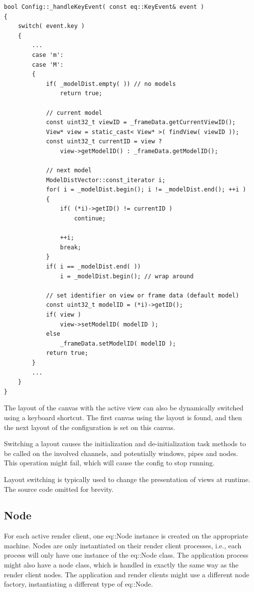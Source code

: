 \documentclass[10pt,a4]{scrartcl}
\begin{document}
{\footnotesize\begin{lstlisting}
bool Config::_handleKeyEvent( const eq::KeyEvent& event )
{
    switch( event.key )
    {
        ...
        case 'm':
        case 'M':
        {
            if( _modelDist.empty( )) // no models
                return true;

            // current model
            const uint32_t viewID = _frameData.getCurrentViewID();
            View* view = static_cast< View* >( findView( viewID ));
            const uint32_t currentID = view ? 
                view->getModelID() : _frameData.getModelID();

            // next model
            ModelDistVector::const_iterator i;
            for( i = _modelDist.begin(); i != _modelDist.end(); ++i )
            {
                if( (*i)->getID() != currentID )
                    continue;
                
                ++i;
                break;
            }
            if( i == _modelDist.end( ))
                i = _modelDist.begin(); // wrap around
            
            // set identifier on view or frame data (default model)
            const uint32_t modelID = (*i)->getID();
            if( view )
                view->setModelID( modelID );
            else
                _frameData.setModelID( modelID );
            return true;
        }
        ...
    }
}
\end{lstlisting}}

The layout of the canvas with the active view can also be dynamically
switched using a keyboard shortcut. The first canvas using the layout is
found, and then the next layout of the configuration is set on this
canvas. 

Switching a layout causes the initialization and de-initialization task
methods to be called on the involved channels, and potentially windows,
pipes and nodes. This operation might fail, which will cause the config
to stop running.

Layout switching is typically used to change the presentation of views
at runtime. The source code omitted for brevity.


\subsection{Node}

For each active render client, one \textsf{eq::Node} instance is
created on the appropriate machine. Nodes are only instantiated on their
render client processes, i.e., each process will only have one
instance of the \textsf{eq::Node} class. The application process might
also have a node class, which is handled in exactly the same way as the
render client nodes. The application and render clients might use a
different node factory, instantiating a different type of \textsf{eq::Node}.
\end{document}
